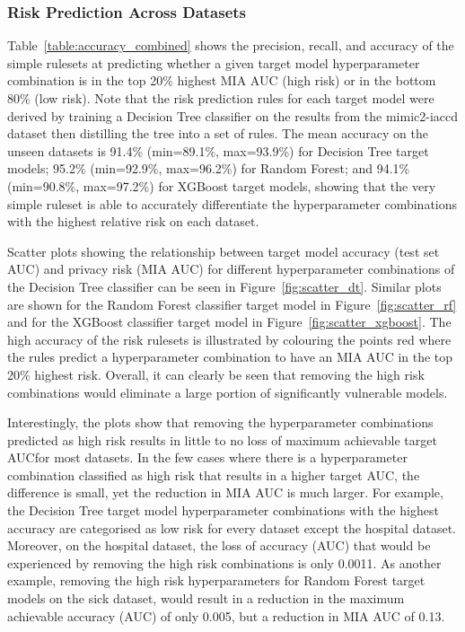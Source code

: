

\subsubsection{Risk Prediction Across Datasets}

Table~\ref{table:accuracy_combined} shows the precision, recall, and accuracy of the simple rulesets at predicting whether a given target model hyperparameter combination is in the top 20\% highest MIA AUC (high risk) or in the bottom 80\% (low risk). Note that the risk prediction rules for each target model were derived by training a Decision Tree classifier on the results from the mimic2-iaccd dataset then distilling the tree into a set of rules. The mean accuracy on the unseen datasets is 91.4\% (min=89.1\%, max=93.9\%) for Decision Tree target models; 95.2\% (min=92.9\%, max=96.2\%) for Random Forest; and 94.1\% (min=90.8\%, max=97.2\%) for XGBoost target models, showing that the very simple ruleset is able to accurately differentiate the hyperparameter combinations with the highest relative risk on each dataset.



Scatter plots showing the relationship between target model accuracy (test set AUC) and privacy risk (MIA AUC) for different hyperparameter combinations of the Decision Tree classifier can be seen in Figure~\ref{fig:scatter_dt}. Similar plots are shown for the Random Forest classifier target model in Figure~\ref{fig:scatter_rf} and for the XGBoost classifier target model in Figure~\ref{fig:scatter_xgboost}. The high accuracy of the risk rulesets is illustrated by colouring the points red where the rules predict a hyperparameter combination to have an MIA AUC in the top 20\% highest risk. Overall, it can clearly be seen that removing the high risk combinations would eliminate a large portion of significantly vulnerable models.

Interestingly, the plots show that removing the hyperparameter combinations predicted as high risk results in little to no loss of maximum achievable target AUC\@ for most datasets. In the few cases where there is a hyperparameter combination classified as high risk that results in a higher target AUC, the difference is small, yet the reduction in MIA AUC is much larger. For example, the Decision Tree target model hyperparameter combinations with the highest accuracy are categorised as low risk for every dataset except the hospital dataset. Moreover, on the hospital dataset, the loss of accuracy (AUC) that would be experienced by removing the high risk combinations is only 0.0011. As another example, removing the high risk hyperparameters for Random Forest target models on the sick dataset, would result in a reduction in the maximum achievable accuracy (AUC) of only 0.005, but a reduction in MIA AUC of 0.13. 

